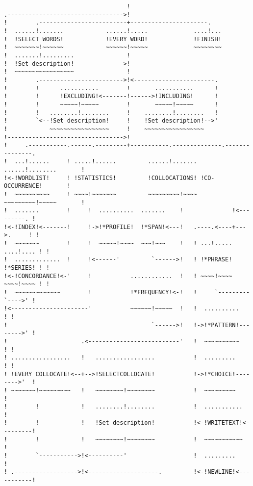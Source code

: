 \begin{verbatim}
                                   !
.--------------------------------->!
!        .-------------------------+----------------------.
!  ......!.......            ......!.....             ....!...
!  !SELECT WORDS!            !EVERY WORD!             !FINISH!
!  ~~~~~~~!~~~~~~            ~~~~~~!~~~~~             ~~~~~~~~
!  .......!.........               !
!  !Set description!-------------->!
!  ~~~~~~~~~~~~~~~~~               !
!        .------------------------>!<-----------------------.
!        !      ...........        !       ...........      !
!        !      !EXCLUDING!<-------!------>!INCLUDING!      !
!        !      ~~~~~!~~~~~        !       ~~~~~!~~~~~      !
!        !   ........!........     !    ........!........   !
!        `<--!Set description!     !    !Set description!-->'
!            ~~~~~~~~~~~~~~~~~     !    ~~~~~~~~~~~~~~~~~
!--------------------------------->!
!     .-----------.------.---------+-----------.--------------.---------------.
!  ...!......     ! .....!......         ......!....... ......!........       !
!<-!WORDLIST!     ! !STATISTICS!         !COLLOCATIONS! !CO-OCCURRENCE!       !
!  ~~~~~~~~~~     ! ~~~~!~~~~~~~         ~~~~~~~~~!~~~~ ~~~~~~~~~!~~~~~       !
!  .......        !     !  ..........  .......    !              !<---------. !
!<-!INDEX!<-------!     !->!*PROFILE!  !*SPAN!<---!   .----.<----+--->.     ! !
!  ~~~~~~~        !     !  ~~~~~!~~~~  ~~~!~~~    !   ! ...!..... ....!.... ! !
!  .............  !     !<------'         `------>!   ! !*PHRASE! !*SERIES! ! !
!<-!CONCORDANCE!<-'     !           ............  !   ! ~~~~!~~~~ ~~~~!~~~~ ! !
!  ~~~~~~~~~~~~~        !           !*FREQUENCY!<-!   !     `---------`---->' !
!<----------------------'           ~~~~~~!~~~~~  !   !  ..........         ! !
!                                         `------>!   !->!*PATTERN!-------->' !
!                     .<--------------------------'   !  ~~~~~~~~~~         ! !
! .................   !   .................           !  .........          ! !
! !EVERY COLLOCATE!<--+-->!SELECTCOLLOCATE!           !->!*CHOICE!-------->'  !
! ~~~~~~~!~~~~~~~~~   !   ~~~~~~~~!~~~~~~~~           !  ~~~~~~~~~            !
!        !            !   ........!........           !  ...........          !
!        !            !   !Set description!           !<-!WRITETEXT!<---------!
!        !            !   ~~~~~~~~!~~~~~~~~           !  ~~~~~~~~~~~          !
!        `----------->!<----------'                   !  .........            !
! .------------------>!<--------------------.         !<-!NEWLINE!<-----------!

\end{verbatim}

